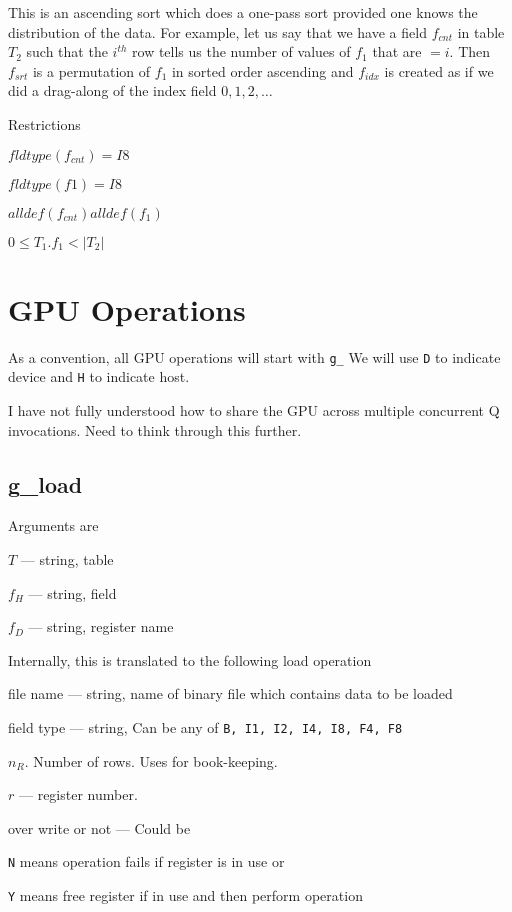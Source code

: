 This is an ascending sort which does a one-pass sort provided one knows
the distribution of the data. For example, let us say that we have a
field \(f_{cnt}\) in table \(T_2\) such that the \(i^{th}\) row 
tells us the number of values of \(f_1\) that are \(= i\).
Then \(f_{srt}\) is a permutation of
\(f_1\) in sorted order ascending and \(f_{idx}\) is created as if we did a
drag-along of the index field \(0, 1, 2, \ldots\)

Restrictions
\be
\item \(fldtype(f_{cnt}) = I8\)
\item \(fldtype(f1) = I8\)
\item \(alldef(f_{cnt}) alldef(f_1)\)
\item \(0 \leq T_1.f_1 < |T_2| \)
\ee

\section{GPU Operations}

As a convention, all GPU operations will start with \verb+g_+
We will use {\tt D} to indicate device and {\tt H} to indicate host.

I have not fully understood how to share the GPU across multiple
concurrent Q invocations. Need to think through this further. 

\subsection{g\_load}
\label{g_load}

Arguments are 
\be
\item \(T\)   --- string, table
\item \(f_H\) --- string, field
\item \(f_D\) --- string, register name 
\ee

Internally, this is translated to the following load operation
\be
\item file name ---  string, name of binary file which contains data 
to be loaded
\item field type --- string, Can be any of \verb+B, I1, I2, I4, I8, F4, F8+
\item \(n_R\). Number of rows. Uses for book-keeping.
\item \(r\) --- register number. 
\item over write or not --- Could be 
\be
\item \verb+N+ means operation fails if register is in use or 
\item \verb+Y+ means free register if in use and then perform operation
\ee
\ee

